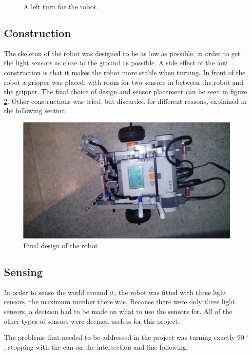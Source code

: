 \begin{figure}

 \caption{A left turn for the robot.}
 \label{fig:left_turn}
\end{figure}

\subsection{Construction}
The skeleton of the robot was designed to be as low as possible, in order to get the light sensors as close to the ground as possible. A side effect of the low construction is that it makes the robot more stable when turning. In front of the robot a gripper was placed, with room for two sensors in between the robot and the gripper. The final choice of design and sensor placement can be seen in figure \ref{fig:final_robot}. Other constructions was tried, but discarded for different reasons, explained in the following section.

\begin{figure}[H]
\centering
 \includegraphics[scale = 0.1]{img/robot.jpg}
 \caption{Final design of the robot}
 \label{fig:final_robot}
\end{figure}

\subsection{Sensing}
In order to sense the world around it, the robot was fitted with three light sensors, the maximum number there was. Because there were only three light sensors, a decision had to be made on what to use the sensors for. All of the other types of sensors were deemed useless for this project.

The problems that needed to be addressed in the project was turning exactly 90 $^{\circ}$, stopping with the can on the intersection and line following.

